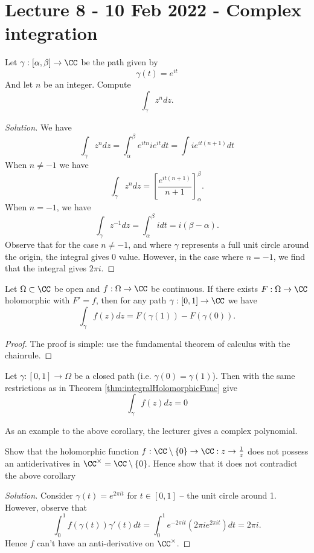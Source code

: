 \section{Lecture 8 - 10 Feb 2022 - Complex integration}
\begin{example}
  Let $\gamma:[\alpha,\beta]\to\CC$ be the path given by 
  \[\gamma(t)= e^{it}\]
  And let $n$ be an integer. Compute
  \[\int_{\gamma} z^n dz.\]
\end{example}
\begin{proof}[Solution]
  We have 
  \[\int_{\gamma}z^n dz = \int_{\alpha}^{\beta} e^{itn} ie^{it} dt=\int
  ie^{it(n+1)}dt\]
  When $n\neq -1$ we have 
  \[\int_{\gamma}z^n dz = \left[ \frac{e^{it(n+1)}}{n+1}
  \right]_{\alpha}^{\beta}.\]
  When $n=-1$, we have
  \[\int_{\gamma}z^{-1}dz = \int_{\alpha}^{\beta}i dt = i(\beta-\alpha).\]
  Observe that for the case $n\neq -1$, and where $\gamma$ represents a full unit
  circle around the origin, the integral gives $0$ value. However, in the case
  where $n=-1$, we find that the integral gives $2\pi i$.
\end{proof}

\begin{theorem}
  Let $\Omega\subset\CC$ be open and $f:\Omega\to\CC$ be continuous. If there
  exists $F:\Omega\to\CC$ holomorphic with $F'=f$, then for any path
  $\gamma:[0,1]\to\CC$ we have 
  \[\int_{\gamma} f(z)dz = F(\gamma(1))-F(\gamma(0)).\]
  \label{thm:integralHolomorphicFunc}
\end{theorem}
\begin{proof}
  The proof is simple: use the fundamental theorem of calculus with the
  chainrule.
\end{proof}

\begin{corollary}
  Let $\gamma:[0,1]\to\Omega$ be a closed path (i.e. $\gamma(0)=\gamma(1)$).
  Then with the same restrictions as in Theorem
  \ref{thm:integralHolomorphicFunc} give
  \[\int_{\gamma}f(z)dz =0\]
  \label{<+label+>}
\end{corollary}
As an example to the above corollary, the lecturer gives a complex polynomial.

\begin{example}
  Show that the holomorphic function
  $f:\CC\setminus\{0\}\to\CC:z\to\frac{1}{z}$ does not possess an
  antiderivatives in $\CC^{\times}=\CC\setminus\{0\}$. Hence show that it does
  not contradict the above corollary
\end{example}
\begin{proof}[Solution]
  Consider $\gamma(t)=e^{2\pi i t}$ for $t\in[0,1]$ -- the unit circle around
  1. However, observe that 
  \[\int_0^1 f(\gamma(t))\gamma'(t)dt = \int_0^1 e^{-2\pi i t} (2\pi i
  e^{2\pi i t})dt = 2\pi i.\]
  Hence $f$ can't have an anti-derivative on $\CC^{\times}$.
\end{proof}

